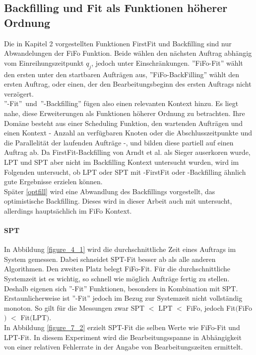 \FloatBarrier
\subsection{Backfilling und Fit als Funktionen höherer Ordnung}
\label{chap:higher-order}

Die in Kapitel 2 vorgestellten Funktionen FirstFit und Backfilling sind nur Abwandelungen der FiFo Funktion. Beide wählen den nächsten Auftrag abhängig vom Einreihungszeitpunkt $q_j$, jedoch unter Einschränkungen. ''FiFo-Fit'' wählt den ersten unter den startbaren Aufträgen aus, ''FiFo-BackFilling'' wählt den ersten Auftrag, oder einen, der den Bearbeitungsbeginn des ersten Auftrags nicht verzögert.\\ \mbox{''-Fit'' und ''-Backfilling''} fügen also einen relevanten Kontext hinzu. Es liegt nahe, diese Erweiterungen als Funktionen höherer Ordnung zu betrachten. Ihre Domäne besteht aus einer Scheduling Funktion, den wartenden Aufträgen und einen Kontext - Anzahl an verfügbaren Knoten oder die Abschlusszeitpunkte und die Parallelität der laufenden Aufträge -, und bilden diese partiell auf einen Auftrag ab. 
Da FirstFit-Backfilling von Arndt et al. als Sieger auserkoren wurde, LPT und SPT aber nicht im Backfilling Kontext untersucht wurden, wird im Folgenden untersucht, ob LPT oder SPT mit -FirstFit oder -Backfilling ähnlich gute Ergebnisse erzielen können.\\
Später \ref{optfill} wird eine Abwandlung des Backfillings vorgestellt, das optimistische Backfilling. Dieses wird in dieser Arbeit auch mit untersucht, allerdings hauptsächlich im FiFo Kontext.

\paragraph{SPT}
\label{spt-higher-order}
In Abbildung \ref{figure_4_1} wird die durchschnittliche Zeit eines Auftrags im System gemessen. Dabei schneidet SPT-Fit besser ab als alle anderen Algorithmen. Den zweiten Platz belegt FiFo-Fit. Für die durchschnittliche Systemzeit ist es wichtig, so schnell wie möglich Aufträge fertig zu stellen. Deshalb eigenen sich ''-Fit'' Funktionen, besonders in Kombination mit SPT. Erstaunlicherweise ist ''-Fit'' jedoch im Bezug zur Systemzeit nicht vollständig monoton. So gilt für die Messungen zwar SPT $<$ LPT $<$ FiFo, jedoch Fit$($FiFo$)$ $<$ Fit$($LPT$)$.\\
In Abbildung \ref{figure_7_2} erzielt SPT-Fit die selben Werte wie FiFo-Fit und LPT-Fit. In diesem Experiment wird die Bearbeitungsspanne in Abhängigkeit von einer relativen Fehlerrate in der Angabe von Bearbeitungszeiten ermittelt.\\


